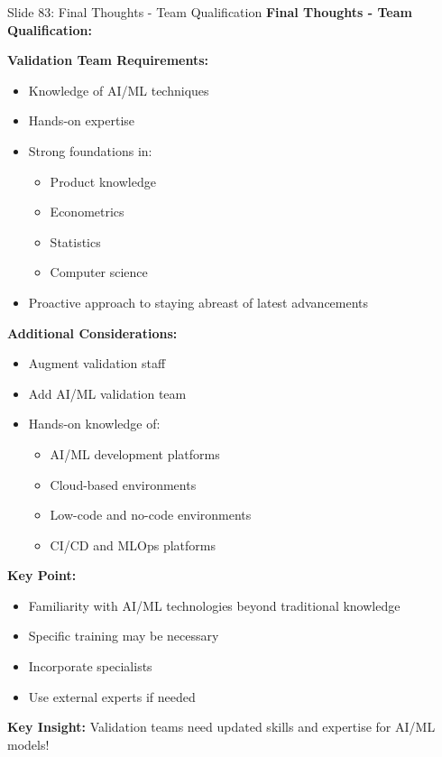 \documentclass[8pt]{beamer}
\begin{document}
	\begin{frame}{Slide 83: Final Thoughts - Team Qualification}
		\fontsize{6.5}{7.5}\selectfont
		\textbf{Final Thoughts - Team Qualification:}
		
		\vspace{0.1cm}
		\textbf{Validation Team Requirements:}
		\begin{itemize}
			\item Knowledge of AI/ML techniques
			\item Hands-on expertise
			\item Strong foundations in:
			\begin{itemize}
				\item Product knowledge
				\item Econometrics
				\item Statistics
				\item Computer science
			\end{itemize}
			\item Proactive approach to staying abreast of latest advancements
		\end{itemize}
		
		\vspace{0.1cm}
		\textbf{Additional Considerations:}
		\begin{itemize}
			\item Augment validation staff
			\item Add AI/ML validation team
			\item Hands-on knowledge of:
			\begin{itemize}
				\item AI/ML development platforms
				\item Cloud-based environments
				\item Low-code and no-code environments
				\item CI/CD and MLOps platforms
			\end{itemize}
		\end{itemize}
		
		\vspace{0.1cm}
		\textbf{Key Point:}
		\begin{itemize}
			\item Familiarity with AI/ML technologies beyond traditional knowledge
			\item Specific training may be necessary
			\item Incorporate specialists
			\item Use external experts if needed
		\end{itemize}
		
		\textcolor{myblue}{\textbf{Key Insight:}} Validation teams need \textcolor{myblue}{updated skills and expertise for AI/ML models}!
	\end{frame}
	
\end{document}
